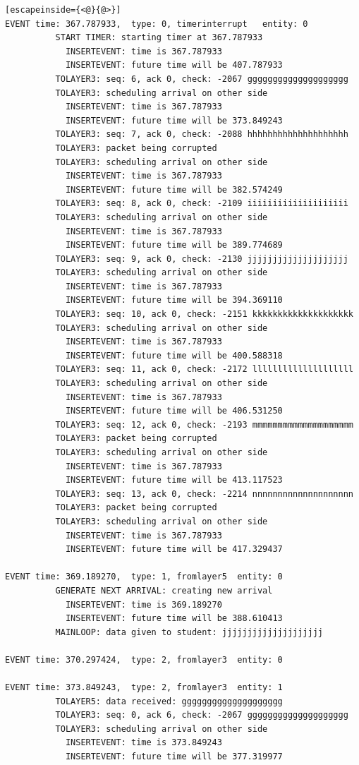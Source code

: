 \documentclass[paper=a4, fontsize=11pt]{scrartcl}
\numberwithin{equation}{section}		%
\numberwithin{figure}{section}			%
\numberwithin{table}{section}				%
\begin{document}
\begin{lstlisting}[escapeinside={<@}{@>}]
EVENT time: 367.787933,  type: 0, timerinterrupt   entity: 0
          START TIMER: starting timer at 367.787933
            INSERTEVENT: time is 367.787933
            INSERTEVENT: future time will be 407.787933
          TOLAYER3: seq: 6, ack 0, check: -2067 gggggggggggggggggggg
          TOLAYER3: scheduling arrival on other side
            INSERTEVENT: time is 367.787933
            INSERTEVENT: future time will be 373.849243
          TOLAYER3: seq: 7, ack 0, check: -2088 hhhhhhhhhhhhhhhhhhhh
          TOLAYER3: packet being corrupted
          TOLAYER3: scheduling arrival on other side
            INSERTEVENT: time is 367.787933
            INSERTEVENT: future time will be 382.574249
          TOLAYER3: seq: 8, ack 0, check: -2109 iiiiiiiiiiiiiiiiiiii
          TOLAYER3: scheduling arrival on other side
            INSERTEVENT: time is 367.787933
            INSERTEVENT: future time will be 389.774689
          TOLAYER3: seq: 9, ack 0, check: -2130 jjjjjjjjjjjjjjjjjjjj
          TOLAYER3: scheduling arrival on other side
            INSERTEVENT: time is 367.787933
            INSERTEVENT: future time will be 394.369110
          TOLAYER3: seq: 10, ack 0, check: -2151 kkkkkkkkkkkkkkkkkkkk
          TOLAYER3: scheduling arrival on other side
            INSERTEVENT: time is 367.787933
            INSERTEVENT: future time will be 400.588318
          TOLAYER3: seq: 11, ack 0, check: -2172 llllllllllllllllllll
          TOLAYER3: scheduling arrival on other side
            INSERTEVENT: time is 367.787933
            INSERTEVENT: future time will be 406.531250
          TOLAYER3: seq: 12, ack 0, check: -2193 mmmmmmmmmmmmmmmmmmmm
          TOLAYER3: packet being corrupted
          TOLAYER3: scheduling arrival on other side
            INSERTEVENT: time is 367.787933
            INSERTEVENT: future time will be 413.117523
          TOLAYER3: seq: 13, ack 0, check: -2214 nnnnnnnnnnnnnnnnnnnn
          TOLAYER3: packet being corrupted
          TOLAYER3: scheduling arrival on other side
            INSERTEVENT: time is 367.787933
            INSERTEVENT: future time will be 417.329437

EVENT time: 369.189270,  type: 1, fromlayer5  entity: 0
          GENERATE NEXT ARRIVAL: creating new arrival
            INSERTEVENT: time is 369.189270
            INSERTEVENT: future time will be 388.610413
          MAINLOOP: data given to student: jjjjjjjjjjjjjjjjjjjj

EVENT time: 370.297424,  type: 2, fromlayer3  entity: 0

EVENT time: 373.849243,  type: 2, fromlayer3  entity: 1
          TOLAYER5: data received: gggggggggggggggggggg
          TOLAYER3: seq: 0, ack 6, check: -2067 gggggggggggggggggggg
          TOLAYER3: scheduling arrival on other side
            INSERTEVENT: time is 373.849243
            INSERTEVENT: future time will be 377.319977


\end{lstlisting}
\end{document}
